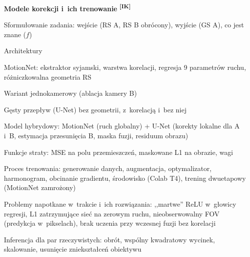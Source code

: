 \documentclass[11pt,a4paper]{article}
\newcommand{\IK}{\textsuperscript{\textbf{[IK]}}}
\begin{document}
\begin{toc}
\item \textbf{Modele korekcji i~ich trenowanie} \IK
  \begin{toc}
    \item Sformułowanie zadania: wejście (RS A, RS B obrócony), wyjście (GS A), co jest znane ($f$)
    \item Architektury
      \begin{toc}
        \item MotionNet: ekstraktor syjamski, warstwa korelacji, regresja 9 parametrów ruchu,
              różniczkowalna geometria RS
        \item Wariant jednokamerowy (ablacja kamery B)
        \item Gęsty przepływ (U-Net) bez geometrii, z~korelacją i~bez niej
        \item Model hybrydowy: MotionNet (ruch globalny) + U-Net (korekty lokalne dla A i~B,
              estymacja przesunięcia B, maska fuzji, residuum obrazu)
      \end{toc}
    \item Funkcje straty: MSE na polu przemieszczeń, maskowane L1 na obrazie, wagi
    \item Proces trenowania: generowanie danych, augmentacja, optymalizator, harmonogram,
          obcinanie gradientu, środowisko (Colab T4), trening dwuetapowy (MotionNet zamrożony)
    \item Problemy napotkane w~trakcie i~ich rozwiązania: ,,martwe'' ReLU w~głowicy regresji,
          L1 zatrzymujące sieć na zerowym ruchu, nieobserwowalny FOV (predykcja w~pikselach),
          brak uczenia przy wczesnej fuzji bez korelacji
    \item Inferencja dla par rzeczywistych: obrót, wspólny kwadratowy wycinek, skalowanie,
          usunięcie zniekształceń obiektywu
  \end{toc}


\end{toc}
\end{document}
